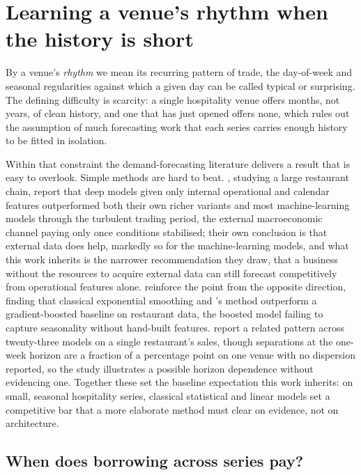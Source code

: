 \section{Learning a venue's rhythm when the history is short}
\label{sec:rw-rhythm}

By a venue's \emph{rhythm} we mean its recurring pattern of trade, the
day-of-week and seasonal regularities against which a given day can be called
typical or surprising. The defining difficulty is scarcity: a single hospitality
venue offers months, not years, of clean history, and one that has just opened
offers none, which rules out the assumption of much forecasting work that each
series carries enough history to be fitted in isolation.

Within that constraint the demand-forecasting literature delivers a result that
is easy to overlook. Simple methods are hard to beat. \citet{chae_value_2024},
studying a large restaurant chain, report that deep models given only internal
operational and calendar features outperformed both their own richer variants and
most machine-learning models through the turbulent trading period, the external
macroeconomic channel paying only once conditions stabilised; their own
conclusion is that external data does help, markedly so for the machine-learning
models, and what this work inherits is the narrower recommendation they draw,
that a business without the resources to acquire external data can still forecast
competitively from operational features alone.
\citet{hossain_comparative_2025} reinforce the point from the opposite direction,
finding that classical exponential smoothing and
\citet{croston_forecasting_1972}'s method outperform a gradient-boosted baseline
on restaurant data, the boosted model failing to capture seasonality without
hand-built features. \citet{schmidt_machine_2022} report a related pattern across
twenty-three models on a single restaurant's sales, though separations at the
one-week horizon are a fraction of a percentage point on one venue with no
dispersion reported, so the study illustrates a possible horizon dependence
without evidencing one. Together these set the baseline expectation this work
inherits: on small, seasonal hospitality series, classical statistical and linear
models set a competitive bar that a more elaborate method must clear on evidence,
not on architecture.

\subsection{When does borrowing across series pay?}

